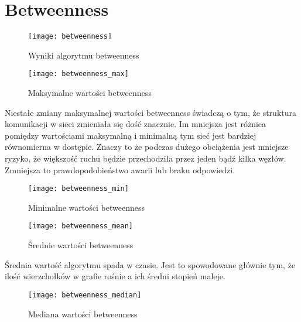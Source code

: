 \section{Betweenness}
\FloatBarrier
\begin{figure}[h]
	\centering
	\texttt{[image: betweenness]}
	\caption{Wyniki algorytmu betweenness}
\end{figure}
\FloatBarrier
\begin{figure}[h]
	\centering
	\texttt{[image: betweenness\_max]}
	\caption{Maksymalne wartości betweenness}
\end{figure}
\FloatBarrier
Niestałe zmiany maksymalnej wartości betweenness świadczą o tym, że struktura komunikacji w sieci zmieniała się dość znacznie. Im mniejsza jest różnica pomiędzy wartościami maksymalną i minimalną tym sieć jest bardziej równomierna w dostępie. Znaczy to że podczas dużego obciążenia jest mniejsze ryzyko, że większość ruchu będzie przechodziła przez jeden bądź kilka węzłów. Zmniejsza to prawdopodobieństwo awarii lub braku odpowiedzi.
\FloatBarrier
\begin{figure}[h]
	\centering
	\texttt{[image: betweenness\_min]}
	\caption{Minimalne wartości betweenness}
\end{figure}
\FloatBarrier\FloatBarrier
\begin{figure}[h]
	\centering
	\texttt{[image: betweenness\_mean]}
	\caption{Średnie wartości betweenness}
\end{figure}
\FloatBarrier
Średnia wartość algorytmu spada w czasie. Jest to spowodowane głównie tym, że ilość wierzchołków w grafie rośnie a ich średni stopień maleje.
\FloatBarrier
\begin{figure}[h]
	\centering
	\texttt{[image: betweenness\_median]}
	\caption{Mediana wartości betweenness}
\end{figure}
\FloatBarrier
\newpage